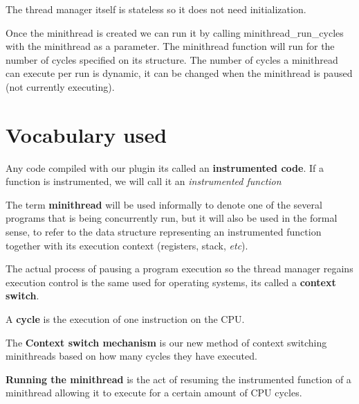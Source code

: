 \documentclass[12pt,a4paper]{report}
\begin{document}
The thread manager itself is stateless so it does not need initialization.  

Once the minithread is created we can run it by calling minithread\_run\_cycles with the minithread as a parameter. The minithread function will run for the number of cycles specified on its structure. The number of cycles a minithread can execute per run is dynamic, it can be changed when the minithread is paused (not currently executing).

\section{Vocabulary used}

Any code compiled with our plugin its called an \textbf{instrumented code}. If a function is instrumented, we will call it an \textit{instrumented function}

The term \textbf{minithread} will be used informally to denote one of the several programs that is being concurrently run, but it will also be used in the formal sense, to refer to the data structure representing an instrumented function together with its execution context (registers, stack, \textit{etc}).

The actual process of pausing a program execution so the thread manager regains execution control is the same used for operating systems, its called a \textbf{context switch}. 

A \textbf{cycle} is the execution of one instruction on the CPU.

The \textbf{Context switch mechanism} is our new method of context switching minithreads based on how many cycles they have executed.

\textbf{Running the minithread} is the act of resuming the instrumented function of a minithread allowing it to execute for a certain amount of CPU cycles.

\clearpage
\clearpage
\end{document}
